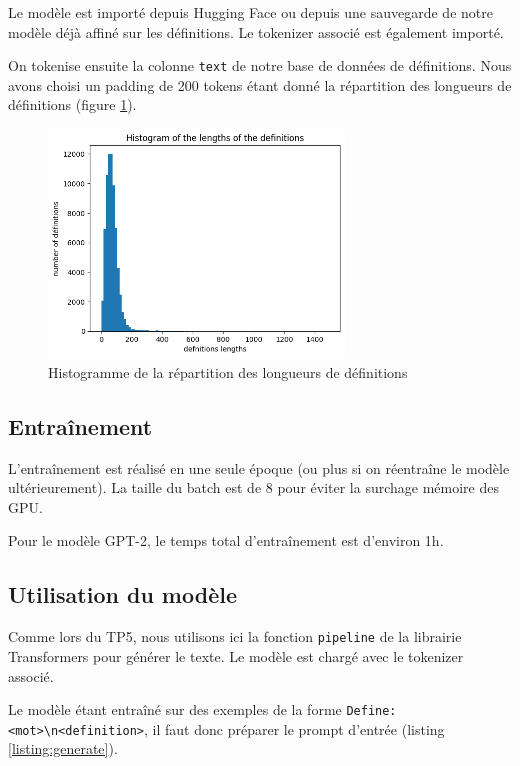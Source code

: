 \documentclass[french]{template}
\begin{document}
Le modèle est importé depuis Hugging Face ou depuis une sauvegarde de notre modèle déjà affiné sur les définitions. Le tokenizer associé est également importé.

On tokenise ensuite la colonne \texttt{text} de notre base de données de définitions. Nous avons choisi un padding de 200 tokens étant donné la répartition des longueurs de définitions (figure \ref{fig:lengths}).

\begin{figure}[H]
    \centering
    \includegraphics[width=0.7\textwidth]{img/lengths.png}
    \caption{Histogramme de la répartition des longueurs de définitions}
    \label{fig:lengths}
\end{figure}

\subsection{Entraînement}

L'entraînement est réalisé en une seule époque (ou plus si on réentraîne le modèle ultérieurement). La taille du batch est de 8 pour éviter la surchage mémoire des GPU.

Pour le modèle GPT-2, le temps total d'entraînement est d'environ 1h.

\subsection{Utilisation du modèle}

Comme lors du TP5, nous utilisons ici la fonction \texttt{pipeline} de la librairie Transformers pour générer le texte. Le modèle est chargé avec le tokenizer associé.

Le modèle étant entraîné sur des exemples de la forme \texttt{Define: \textless mot\textgreater\textbackslash n\textless definition\textgreater}, il faut donc préparer le prompt d'entrée (listing \ref{listing:generate}).
\end{document}
